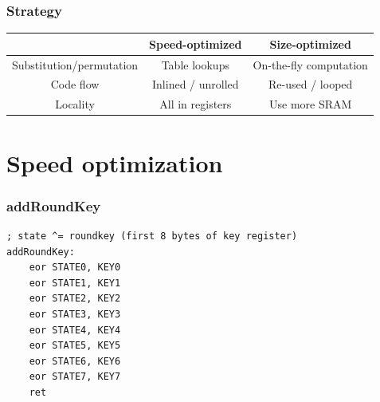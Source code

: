 \documentclass{beamer}
\begin{document}
\begin{frame}[fragile]
\frametitle{Strategy}
\renewcommand\arraystretch{2.5}
\begin{tabular}{|c|c|c|}
	\hline
	& Speed-optimized & Size-optimized \\
	\hline
Substitution/permutation & Table lookups & On-the-fly computation \\
	\hline
Code flow & Inlined / unrolled & Re-used / looped \\
	\hline
Locality & All in registers & Use more SRAM \\
	\hline
\end{tabular}
\renewcommand\arraystretch{1}
\end{frame}

\section{Speed optimization}
\begin{frame}[fragile]
\frametitle{addRoundKey}
\begin{lstlisting}
; state ^= roundkey (first 8 bytes of key register)
addRoundKey:
    eor STATE0, KEY0
    eor STATE1, KEY1
    eor STATE2, KEY2
    eor STATE3, KEY3
    eor STATE4, KEY4
    eor STATE5, KEY5
    eor STATE6, KEY6
    eor STATE7, KEY7
    ret
\end{lstlisting}
\end{frame}
\end{document}
